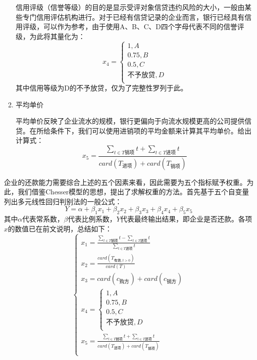 \documentclass{my_paper}
\begin{document}
\begin{enumerate}
    信用评级\cite{3}（信誉等级）的目的是显示受评对象信贷违约风险的大小，一般由某些专门信用评估机构进行。对于已经有信贷记录的企业而言，银行已经具有信用评级，可以作为参考，由于使用A、B、C、D四个字母代表不同的信誉评级，为此将其量化为：
    \begin{equation}
    x_4 = \begin{cases}
        1,A\\
        0.75,B\\
        0.5,C\\
        \text{不予放贷},D\\
    \end{cases}
    \label{x4}
    \end{equation}
    其中信用等级为D的不予放贷，仅为了完整性罗列于此。

    \item 平均单价
    
    平均单价反映了企业流水的规模，银行更偏向于向流水规模更高的公司提供信贷。在所给条件下，我们可以使用进销项的平均金额来计算其平均单价。给出计算式：
    \begin{equation}
    x_5 = \frac{\sum\limits_{t\in T\text{销项}}t+\sum\limits_{t\in T\text{进项}}t}{card(T_{\text{进项}})+card(T_{\text{销项}})}
    \label{x5}
    \end{equation}

\end{enumerate}
企业的还款能力需要综合上述的五个因素来看，因此需要为五个指标赋予权重。为此，我们借鉴Chesser模型\cite{4}的思想，提出了求解权重的方法。首先基于五个自变量列出多元线性回归\cite{5}判别法的一般公式： 
\begin{equation}
Y = \alpha + \beta_1x_1 +\beta_2x_2 +\beta_3x_3 +\beta_4x_4 +\beta_5x_5 
\label{Y}
\end{equation}
其中$\alpha$代表常系数，$\beta$代表比例系数，$Y$代表最终输出结果，即企业是否还款。各项$x$的数值已在前文说明，总结如下：
$$\begin{cases}
    x_1 = \frac{\sum\limits_{t\in T\text{销项}}t-\sum\limits_{t\in T\text{进项}}t}{\sum\limits_{t\in T\text{进项}}t}\\
    x_2 = \frac{card(T_{\text{有效},t>0})}{card(T)}
        \\
        x_3 = card(c_{\text{购方}})+card(c_{\text{销方}})
    \\x_4 = \begin{cases}
        1,A\\
        0.75,B\\
        0.5,C\\
        \text{不予放贷},D\\
    \end{cases}\\
    x_5 = \frac{\sum\limits_{t\in T\text{销项}}t+\sum\limits_{t\in T\text{进项}}t}{card(T_{\text{进项}})+card(T_{\text{销项}})}
    \\
\end{cases}$$
\end{document}
